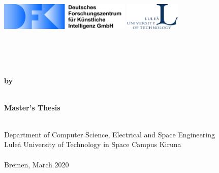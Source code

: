 
\begin{titlingpage}%
    \begin{flushleft}
        \includegraphics[height=13mm]{pictures/logo_dfki_text}\hfill %
        \includegraphics[height=13mm]{pictures/logo_uni}~\\%
    \end{flushleft}
    \vspace{3mm}
    \vspace{8mm}
    \textbf{\Large{}}\\

    \begin{center}
        \textbf{\Large{\myWorkingTitle}}\\
        \textbf{\Large{}}\\[2ex]
        \textbf{by}\\
        \textbf{\thesisAuthor}\\
        \vspace{3cm}

        \textbf{{Master's Thesis}}\\
        \textbf{}\\

        \vspace{4cm}

        Department of Computer Science, Electrical and Space Engineering\\
        Luleå University of Technology in Space Campus Kiruna\\
        \textbf{}\\
        \vspace{1.6cm}
        {Bremen, March 2020}


    \end{center}

\end{titlingpage}%

